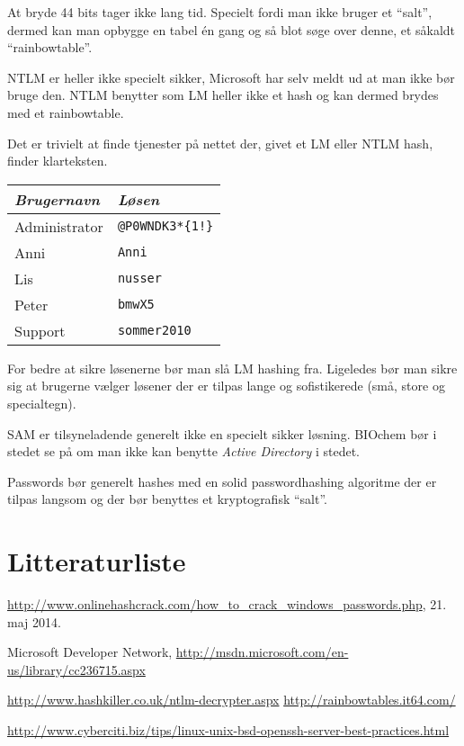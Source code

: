 \documentclass[10pt,a4paper,danish]{article}
\begin{document}
At bryde 44 bits tager ikke lang tid.
Specielt fordi man ikke bruger et ``salt'', dermed kan man opbygge en tabel én
gang og så blot søge over denne, et såkaldt ``rainbowtable''.


NTLM er heller ikke specielt sikker, Microsoft har selv meldt ud at man ikke bør
bruge den. NTLM benytter som LM heller ikke et hash og kan dermed brydes med et
rainbowtable.

Det er trivielt at finde tjenester\cite{cracker1} \cite{cracker2} på nettet der, givet et LM eller NTLM hash, finder
klarteksten.

\begin{table}[h!]
  \centering
  \begin{tabular}{ll}
    \textit{Brugernavn} & \textit{Løsen} \\
    \hline
    Administrator & \texttt{@P0WNDK3*\{1!\}}\\
    Anni & \texttt{Anni}\\
    Lis & \texttt{nusser}\\
    Peter & \texttt{bmwX5}\\
    Support & \texttt{sommer2010}
  \end{tabular}
\end{table}

For bedre at sikre løsenerne bør man slå LM hashing fra. Ligeledes bør man sikre
sig at brugerne vælger løsener der er tilpas lange og sofistikerede (små, store
og specialtegn).

SAM er tilsyneladende generelt ikke en specielt sikker løsning. BIOchem bør i stedet se på om
man ikke kan benytte \textit{Active Directory} i stedet.

Passwords bør generelt hashes med en solid passwordhashing algoritme der er
tilpas langsom og der bør benyttes et kryptografisk ``salt''.

\section{Litteraturliste}

\begin{thebibliography}{9}

  \url{http://www.onlinehashcrack.com/how_to_crack_windows_passwords.php}, 21.
  maj 2014.

 Microsoft Developer Network,
  \url{http://msdn.microsoft.com/en-us/library/cc236715.aspx}

 \url{http://www.hashkiller.co.uk/ntlm-decrypter.aspx}
 \url{http://rainbowtables.it64.com/}

 \url{http://www.cyberciti.biz/tips/linux-unix-bsd-openssh-server-best-practices.html}
\end{thebibliography}
\end{document}
